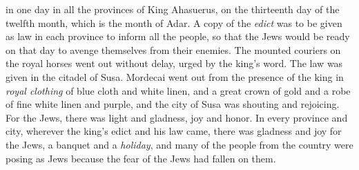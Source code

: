 \begin{biblechapter}
\verse in one day in all the provinces of King Ahasuerus, on the thirteenth day of the twelfth month, which is the month of Adar.
\verse A copy of the \textit{edict} was to be given as law in each province to inform all the people, so that the Jews would be ready on that day to avenge themselves from their enemies.
\verse The mounted couriers on the royal horses went out without delay, urged by the king’s word. The law was given in the citadel of Susa.
\verse Mordecai went out from the presence of the king in \textit{royal clothing} of blue cloth and white linen, and a great crown of gold and a robe of fine white linen and purple, and the city of Susa was shouting and rejoicing.
\verse For the Jews, there was light and gladness, joy and honor.
\verse In every province and city, wherever the king’s edict and his law came, there was gladness and joy for the Jews, a banquet and a \textit{holiday}, and many of the people from the country were posing as Jews because the fear of the Jews had fallen on them.
\end{biblechapter}

